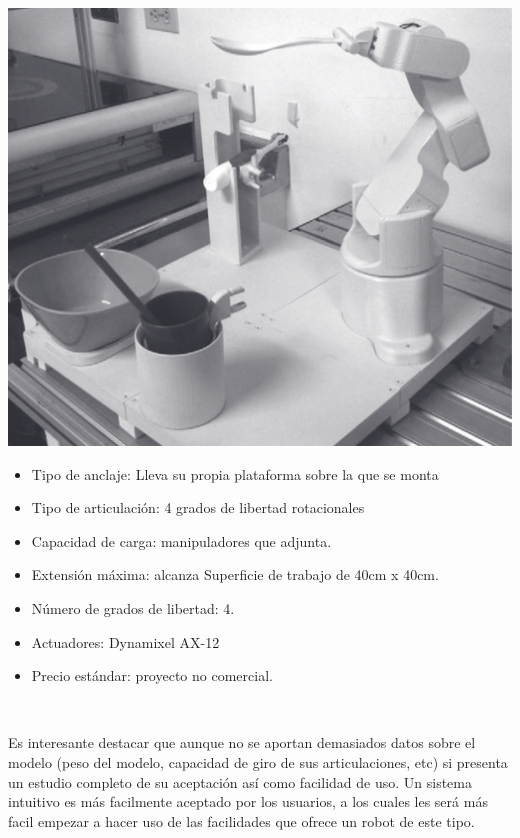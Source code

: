      \begin{minipage}{0.35\textwidth}
       \includegraphics[width=\linewidth]{figuras/Imagenes_EstadoArte/UPamplona.png}
     \end{minipage}
     \begin{minipage}{0.65\textwidth}\raggedright
       \hspace{1cm}
       \begin{itemize}
           \item Tipo de anclaje: Lleva su propia plataforma sobre la que se monta
           \item Tipo de articulación: 4 grados de libertad rotacionales
           \item Capacidad de carga: manipuladores que adjunta.
           \item Extensión máxima: alcanza Superficie de trabajo de 40cm x 40cm.
           \item Número de grados de libertad: 4.
           \item Actuadores: Dynamixel AX-12
           \item Precio estándar: proyecto no comercial.
       \end{itemize}
     \end{minipage}
     \\

     \vspace{0.1cm}

     Es interesante destacar que aunque no se aportan demasiados datos sobre el modelo (peso del modelo, capacidad de giro de sus articulaciones, etc) si presenta un estudio completo de su aceptación así como facilidad de uso. Un sistema intuitivo es más facilmente aceptado por los usuarios, a los cuales les será más facil empezar a hacer uso de las facilidades que ofrece un robot de este tipo.
     \\

